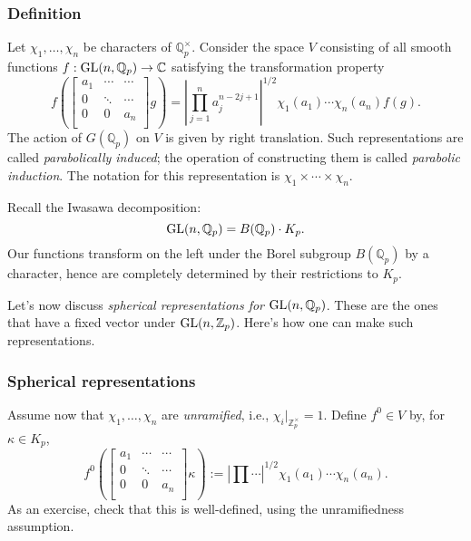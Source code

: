 \documentclass[reqno]{amsart} 
\begin{document}
\subsubsection{Definition}

Let $\chi_1, \dotsc, \chi_n$ be characters of $\mathbb{Q}_p^\times$.  Consider the space $V$ consisting of all smooth functions $f : \operatorname{GL}(n, \mathbb{Q}_p) \rightarrow \mathbb{C}$ satisfying the transformation property
\begin{equation*}
  f \left(
    \begin{bmatrix}
      a_1      & \dotsb & \dotsb \\
      0               & \ddots & \dotsb \\
      0               & 0 & a_n \\
    \end{bmatrix} g \right)
  =
  \left| \prod_{j = 1}^n a_j^{n - 2 j + 1} \right|^{1/2}
  \chi_1(a_1) \dotsb \chi_n(a_n) f(g).
\end{equation*}
The action of $G(\mathbb{Q}_p)$ on $V$ is given by right translation.  Such representations are called \emph{parabolically induced}; the operation of constructing them is called \emph{parabolic induction}.  The notation for this representation is $\chi_1 \times \dotsb \times \chi_n$.

Recall the Iwasawa decomposition:
\begin{equation*}
  \operatorname{GL}(n, \mathbb{Q}_p) = B(\mathbb{Q}_p) \cdot K_p.
\end{equation*}
Our functions transform on the left under the Borel subgroup $B(\mathbb{Q}_p)$ by a character, hence are completely determined by their restrictions to $K_p$.

Let's now discuss \emph{spherical representations for} $\operatorname{GL}(n, \mathbb{Q}_p)$.  These are the ones that have a fixed vector under $\operatorname{GL}(n, \mathbb{Z}_p)$.  Here's how one can make such representations.

\subsubsection{Spherical representations}

Assume now that $\chi_1, \dotsc, \chi_n$ are \emph{unramified}, i.e., $\chi_i |_{\mathbb{Z}_p^\times} = 1$.  Define $f^0 \in V$ by, for $\kappa \in K_p$,
\begin{equation*}
  f^0 \left(
    \begin{bmatrix}
      a_1      & \dotsb  & \dotsb \\
      0               & \ddots & \dotsb \\
      0               & 0 &  a_n \\
    \end{bmatrix} \kappa \right)
  :=
  \left| \prod \dotsb \right|^{1/2} \chi_1(a_1) \dotsb \chi_n(a_n).  
\end{equation*}
As an exercise, check that this is well-defined, using the unramifiedness assumption.
\end{document}
